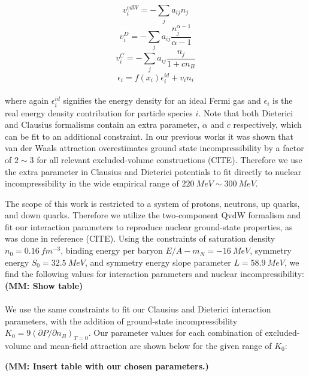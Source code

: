 \documentclass[twocolumn,floatfix,superscriptaddress,a4paper,showkeys,nofootinbib,reprint]{revtex4-1}
\begin{document}
\begin{equation}
\label{eq:MF_VDW}
    v_i^{vdW} = -\sum_j a_{ij}n_j 
\end{equation}
\begin{equation}
\label{eq:MF_D}
    v_i^{D} = -\sum_j a_{ij}\frac{n_j^{\alpha - 1}}{\alpha - 1} 
\end{equation}
\begin{equation}
\label{MF_c}
    v_i^{C} = -\sum_j a_{ij}\frac{n_j}{1 +cn_B} 
\end{equation}
\begin{equation}
    \epsilon_i = f(x_i)\epsilon_i^{id} + v_in_i
\end{equation}
\\
where again $\epsilon_i^{id}$ signifies the energy density for an ideal Fermi gas and $\epsilon_i$ is the real energy density contribution for particle species $i$. Note that both Dieterici and Clausius formalisms contain an extra parameter, $\alpha$ and $c$ respectively, which can be fit to an additional constraint. In our previous works it was shown that van der Waals attraction overestimates ground state incompressibility by a factor of $2\sim3$ for all relevant excluded-volume constructions (CITE). Therefore we use the extra parameter in Clausius and Dieterici potentials to fit directly to nuclear incompressibility in the wide empirical range of $220~ MeV\sim300~MeV$. 

The scope of this work is restricted to a system of protons, neutrons, up quarks, and down quarks. Therefore we utilize the two-component QvdW formalism and fit our interaction parameters to reproduce nuclear ground-state properties, as was done in reference (CITE). Using the constraints of saturation density $n_0 = 0.16~fm^{-3}$, binding energy per baryon $E/A - m_N = -16~MeV$, symmetry energy $S_0 = 32.5~MeV$, and symmetry energy slope parameter $L = 58.9~MeV$, we find the following values for interaction parameters and nuclear incompressibility: \textbf{(MM: Show table)}
\\
\\

We use the same constraints to fit our Clausius and Dieterici interaction parameters, with the addition of ground-state incompressibility $K_0 = 9(\partial P / \partial n_B)_{T=0}$. Our parameter values for each combination of excluded-volume and mean-field attraction are shown below for the given range of $K_0$:

\textbf{(MM: Insert table with our chosen parameters.)}
\end{document}

